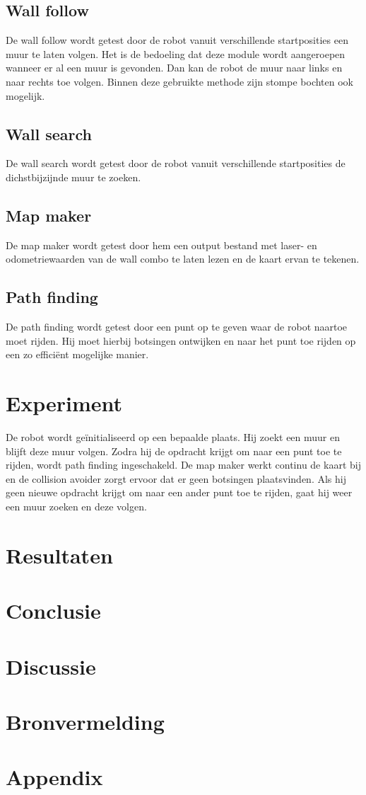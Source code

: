 \documentclass[a4paper,10pt]{article}
\begin{document}
\subsection{Wall follow}
De wall follow wordt getest door de robot vanuit verschillende startposities een muur te laten volgen. Het is de bedoeling dat deze module wordt aangeroepen wanneer er al een muur is gevonden. Dan kan de robot de muur naar links en naar rechts toe volgen. Binnen deze gebruikte methode zijn stompe bochten ook mogelijk.

\subsection{Wall search}
De wall search wordt getest door de robot vanuit verschillende startposities de dichstbijzijnde muur te zoeken. 

\subsection{Map maker}
De map maker wordt getest door hem een output bestand met laser- en odometriewaarden van de wall combo te laten lezen en de kaart ervan te tekenen.

\subsection{Path finding}
De path finding wordt getest door een punt op te geven waar de robot naartoe moet rijden. Hij moet hierbij botsingen ontwijken en naar het punt toe rijden op een zo effici\"{e}nt mogelijke manier.

\section{Experiment}
De robot wordt ge\"{i}nitialiseerd op een bepaalde plaats. Hij zoekt een muur en blijft deze muur volgen. Zodra hij de opdracht krijgt om naar een punt toe te rijden, wordt path finding ingeschakeld. De map maker werkt continu de kaart bij en de collision avoider zorgt ervoor dat er geen botsingen plaatsvinden. Als hij geen nieuwe opdracht krijgt om naar een ander punt toe te rijden, gaat hij weer een muur zoeken en deze volgen.

\section{Resultaten}
\section{Conclusie}
\section{Discussie}
\section{Bronvermelding}
\section{Appendix}
\appendix
\end{document}
